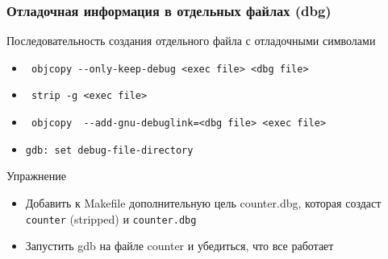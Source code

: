 \begin{frame}[fragile]
  \frametitle{Отладочная информация в отдельных файлах (dbg)}
  \begin{center}
    Последовательность создания отдельного файла с отладочными символами
  \end{center}
  \begin{itemize}
    \item \verb+ objcopy --only-keep-debug <exec file> <dbg file>+
    \item \verb+ strip -g <exec file>+
    \item \verb+ objcopy  --add-gnu-debuglink=<dbg file> <exec file> + 
    \item \texttt{gdb: set debug-file-directory}
  \end{itemize} 
\pause
  \begin{center}
   Упражнение
  \end{center}
  \begin{itemize}
    \item Добавить к Makefile дополнительную цель counter.dbg, которая создаст \texttt{counter} (stripped) и \texttt{counter.dbg}
    \item Запустить gdb на файле counter и убедиться, что все работает
  \end{itemize}
\end{frame}  



